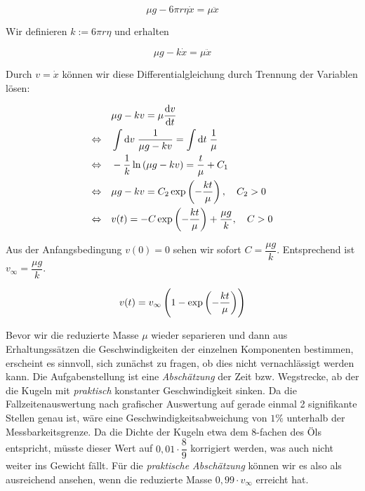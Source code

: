\documentclass[a4paper,german,12pt,smallheadings]{scrartcl}
\begin{document}
\begin{equation}
  \mu g - 6 \pi r \eta \dot{x} = \mu \ddot{x}
\end{equation}

Wir definieren $k := 6 \pi r \eta$ und erhalten

\begin{equation}
  \mu g - k \dot{x} = \mu \ddot{x}
\end{equation}

Durch $v = \dot{x}$ können wir diese Differentialgleichung durch Trennung der
Variablen lösen:

\begin{align*}
  &\mu g - k v = \mu \frac{\dif v}{\dif t} \\
  \Leftrightarrow \quad &
  \int \dif v \; \frac{1}{\mu g - kv} = \int \dif t \; \frac{1}{\mu} \\
  \Leftrightarrow \quad &
  -\frac{1}{k} \ln \del{\mu g - kv} = \frac{t}{\mu} + C_1 \\
  \Leftrightarrow \quad &
  \mu g - kv = C_2 \exp \del{- \frac{kt}{\mu} }, \quad C_2 > 0 \\
  \Leftrightarrow \quad &
  v(t) = -C \exp \del{- \frac{kt}{\mu} } + \frac{\mu g}{k}, \quad C > 0
\end{align*}

Aus der Anfangsbedingung $v(0) = 0$ sehen wir sofort $C = \dfrac{\mu g}{k}$.
Entsprechend ist $v_\infty = \dfrac{\mu g}{k}$.

\begin{equation}
  v(t) = v_\infty \del{1 - \exp\del{-\frac{k t}{\mu}}}
\end{equation}


Bevor wir die reduzierte Masse $\mu$ wieder separieren und dann aus
Erhaltungssätzen die Geschwindigkeiten der einzelnen Komponenten bestimmen,
erscheint es sinnvoll, sich zunächst zu fragen, ob dies nicht vernachlässigt
werden kann. Die Aufgabenstellung ist eine \textit{Abschätzung} der Zeit bzw.
Wegstrecke, ab der die Kugeln mit \textit{praktisch} konstanter Geschwindigkeit
sinken. Da die Fallzeitenauswertung nach grafischer Auswertung auf gerade
einmal 2 signifikante Stellen genau ist, wäre eine Geschwindigkeitsabweichung
von $1 \%$ unterhalb der Messbarkeitsgrenze. Da die Dichte der Kugeln etwa dem
8-fachen des Öls entspricht, müsste dieser Wert auf $0{,}01 \cdot \dfrac{8}{9}$
korrigiert werden, was auch nicht weiter ins Gewicht fällt. Für die
\textit{praktische Abschätzung} können wir es also als ausreichend ansehen,
wenn die reduzierte Masse $0{,}99 \cdot v_\infty$ erreicht hat.
\end{document}
